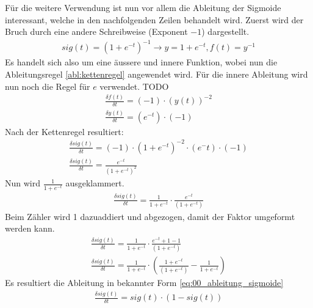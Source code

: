 Für die weitere Verwendung ist nun vor allem die Ableitung der Sigmoide interessant, welche in den nachfolgenden
Zeilen behandelt wird. Zuerst wird der Bruch durch eine andere Schreibweise (Exponent $-1$) dargestellt.
\begin{align}
    sig(t) = (1 + e^{-t})^{-1} \longrightarrow y = 1 + e^{-t}, f(t) = y^{-1}
\end{align}
Es handelt sich also um eine äussere und innere Funktion, wobei nun die Ableitungsregel \ref{abl:kettenregel} angewendet wird.
Für die innere Ableitung wird nun noch die Regel für $e$ verwendet. TODO
\begin{align}
    \frac{\delta f(t)}{\delta t} = (-1) \cdot (y(t))^{-2}\\
    \frac{\delta y(t)}{\delta t} = (e^{-t}) \cdot (-1)
\end{align}
Nach der Kettenregel resultiert:
\begin{align}
    \frac{\delta sig(t)}{\delta t} = (-1) \cdot (1 + e^{-t})^{-2} \cdot (e^-t) \cdot (-1)\\
    \frac{\delta sig(t)}{\delta t} = \frac{e^{-t}}{(1 + e^{-t})^{2}}
\end{align}
Nun wird $\frac{1}{1 + e^{-t}}$ ausgeklammert.
\begin{align}
    \frac{\delta sig(t)}{\delta t} = \frac{1}{1 + e^{-t}} \cdot \frac{e^{-t}}{(1 + e^{-t})}
\end{align}
Beim Zähler wird 1 dazuaddiert und abgezogen, damit der Faktor umgeformt werden kann.
\begin{align}
    \frac{\delta sig(t)}{\delta t} = \frac{1}{1 + e^{-t}} \cdot \frac{e^{-t} + 1 - 1}{(1 + e^{-t})}\\
    \frac{\delta sig(t)}{\delta t} = \frac{1}{1 + e^{-t}} \cdot (\frac{1 + e^{-t}}{(1 + e^{-t})} - \frac{1}{1 + e^{-t}})
\end{align}
Es resultiert die Ableitung in bekannter Form \ref{eq:00_ableitung_sigmoide}
\begin{align}
    \frac{\delta sig(t)}{\delta t} = sig(t) \cdot (1 - sig(t))\label{eq:00_ableitung_sigmoide}
\end{align}

